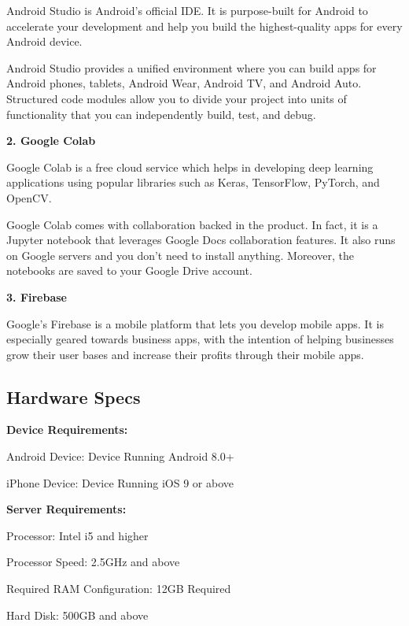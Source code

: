 \documentclass[../Report.tex]{subfiles}
\begin{document}
Android Studio is Android's official IDE. 
It is purpose-built for Android to accelerate your development and help you build the highest-quality apps for every Android device.\par

Android Studio provides a unified environment where you can build apps for 
Android phones, tablets, Android Wear, Android TV, and Android Auto.
Structured code modules allow you to divide your project into units of functionality 
that you can independently build, test, and debug.\par

\textbf{2. Google Colab}

Google Colab is a free cloud service which helps in developing deep learning applications 
using popular libraries such as Keras, TensorFlow, PyTorch, and OpenCV.\par


Google Colab comes with collaboration backed in the product. 
In fact, it is a Jupyter notebook that leverages Google Docs collaboration features. 
It also runs on Google servers and you don’t need to install anything. 
Moreover, the notebooks are saved to your Google Drive account.\par


\textbf{3. Firebase}

Google’s Firebase is a mobile platform that lets you develop mobile apps. 
It is especially geared towards business apps, with the intention of helping businesses grow their user bases and increase their profits through their mobile apps.\par


\subsection{Hardware Specs}

\textbf{Device Requirements:}

Android Device: Device Running Android 8.0+

iPhone Device: Device Running iOS 9 or above


\textbf{Server Requirements:}

Processor: Intel i5 and higher

Processor Speed: 2.5GHz and above

Required RAM Configuration: 12GB Required

Hard Disk: 500GB and above
\end{document}
